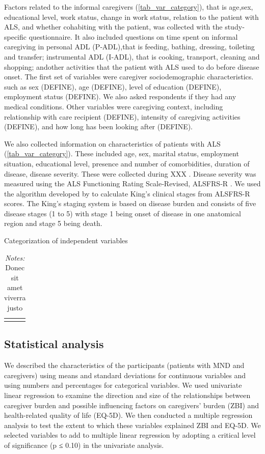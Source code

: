 \documentclass[12pt]{article}
\begin{document}
Factors related to the informal caregivers (\autoref{tab_var_category}), that is age,sex, educational level, work status, change in work status, relation to the patient with ALS, and whether cohabiting with the patient, was collected with the study‐specific questionnaire. It also included questions on time spent on informal caregiving in personal ADL (P‐ADL),that is feeding, bathing, dressing, toileting and transfer; instrumental ADL (I‐ADL), that is cooking, transport, cleaning and shopping; andother activities that the patient with ALS used to do before disease onset. The first set of variables were caregiver sociodemographic characteristics.  such as sex (DEFINE), age (DEFINE), level of education (DEFINE), employment status (DEFINE). We also asked respondents if they had any medical conditions. Other variables were caregiving context, including relationship with care recipient (DEFINE), intensity of caregiving activities (DEFINE), and how long has been looking after (DEFINE).

We also collected information on characteristics of patients with ALS (\autoref{tab_var_category}). These included age, sex, marital status, employment situation, educational level, presence and number of comorbidities, duration of disease, disease severity. These were collected during XXX \parencite{gould_acceptance_2024}. Disease severity was measured using the ALS Functioning Rating Scale‐Revised, ALSFRS‐R \parencite{cedarbaum_alsfrs-r_1999}. We used the algorithm developed by \textcite{balendra_estimating_2014} to calculate King's clinical stages from ALSFRS-R scores. The King's staging system is based on disease burden and consists of five disease stages (1 to 5) with stage 1 being onset of disease in one anatomical region and stage 5 being death.

\hspace{1em}
\begin{table}[H]
    \centering \singlespacing \small
    \caption{Categorization of independent variables}
    \begin{tabular}{|L{6cm}|L{9cm}|}
        \hline
    \end{tabular}
    \label{tab_var_category}
    \caption*{\footnotesize \textit{Notes:} Donec sit amet viverra justo}
\end{table}


\subsection{Statistical analysis}
We described the characteristics of the participants (patients with MND and caregivers) using means and standard deviations for continuous variables and using numbers and percentages for categorical variables. We used univariate linear regression to examine the direction and size of the relationships between caregiver burden and possible influencing factors on  caregivers’ burden (ZBI) and health-related quality of life (EQ-5D). We then conducted a multiple regression analysis to test the extent to which these variables explained ZBI and EQ-5D. We selected variables to add to multiple linear regression by adopting a critical level of significance (p ≤ 0.10) in the univariate analysis.
\end{document}

